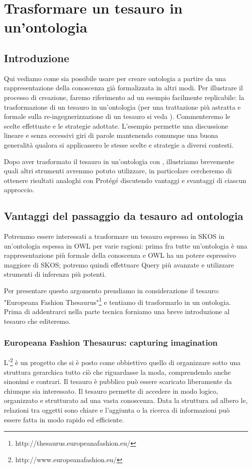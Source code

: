 \chapter{Trasformare un tesauro in un'ontologia}\label{ch3}
\section*{Introduzione}
Qui vediamo come sia possibile usare \cduce per creare ontologia a partire da una rappresentazione della conoscenza già formalizzata in altri modi. Per illustrare il processo di creazione, faremo riferimento ad un esempio facilmente replicabile: la trasformazione di un tesauro in un'ontologia (per una trattazione più astratta e formale sulla re-ingegnerizzazione di un tesauro si veda \cite{re_engineeringThesaurus}). Commenteremo le scelte effettuate e le strategie adottate. L'esempio permette una discussione lineare e senza eccessivi giri di parole mantenendo comunque una buona generalità qualora si applicassero le stesse scelte e strategie a diversi contesti.

Dopo aver trasformato il tesauro in un'ontologia con \cduce, illustriamo brevemente quali altri strumenti avremmo potuto utilizzare, in particolare cercheremo di ottenere risultati analoghi con Protégé discutendo vantaggi e svantaggi di ciascun approccio.

\section{Vantaggi del passaggio da tesauro ad ontologia}
Potremmo essere interessati a trasformare un tesauro espresso in SKOS in un'ontologia espessa in OWL per varie ragioni: prima fra tutte un'ontologia è una rappresentazione più formale della conoscenza e OWL ha un potere espressivo maggiore di SKOS; potremo quindi effettuare Query più avanzate e utilizzare strumenti di inferenza più potenti.

Per presentare questo argomento prendiamo in considerazione il tesauro: "Europeana Fashion Thesaurus"\footnote{http://thesaurus.europeanafashion.eu/} e tentiamo di trasformarlo in un ontologia. Prima di addentrarci nella parte tecnica forniamo una breve introduzione al tesauro che editeremo.
\subsection{Europeana Fashion Thesaurus: capturing imagination}
L'\footnote{http://www.europeanafashion.eu/} è un progetto che si è posto come obbiettivo quello di organizzare sotto una struttura gerarchica tutto ciò che riguardasse la moda, comprendendo anche sinonimi e contrari. Il tesauro è pubblico può essere scaricato liberamente da chiunque sia interessato. Il tesauro permette di accedere in modo logico, organizzato e strutturato ad una vasta conoscenza. Data la struttura ad albero le, relazioni tra oggetti sono chiare e l'aggiunta o la ricerca di informazioni può essere fatta in modo rapido ed efficiente.
